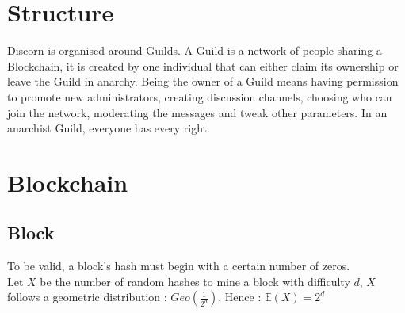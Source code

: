 \documentclass[a4paper,10pt]{article}
\begin{document}
    \section{Structure}
        Discorn is organised around Guilds. A Guild is a network of people sharing a Blockchain, it is created by one individual that
        can either claim its ownership or leave the Guild in anarchy. Being the owner of a Guild means having permission to promote
        new administrators, creating discussion channels, choosing who can join the network, moderating the messages and tweak other parameters.
        In an anarchist Guild, everyone has every right.
        

    \section{Blockchain}
    
        \subsection{Block}
            To be valid, a block's hash must begin with a certain number of zeros. \\
            Let $X$ be the number of random hashes to mine a block with difficulty $d$, $X$ follows a geometric distribution : $Geo(\frac{1}{2^d})$. Hence : $\mathbb{E}(X)= 2^d$
            
            \\
            
\end{document}
